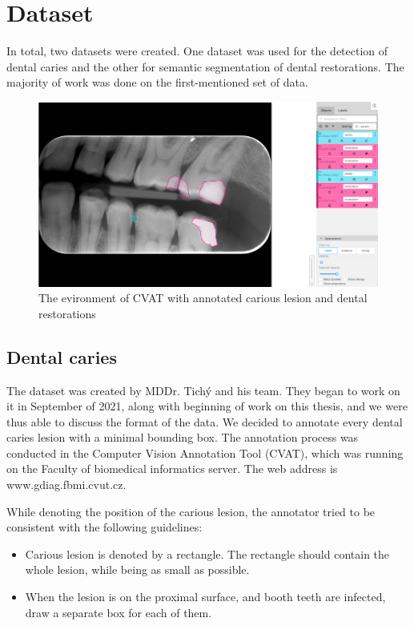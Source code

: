 \chapter{Dataset}
In total, two datasets were created. One dataset was used for the detection of dental caries and the other for semantic segmentation of dental restorations. The majority of work was done on the first-mentioned set of data.

\begin{figure}
    \centering
    \includegraphics[width=\linewidth]{images/cvat.png}
    \caption{The evironment of CVAT with annotated carious lesion and dental restorations}
    \label{fig:cvat}
\end{figure}

\section{Dental caries}
The dataset was created by MDDr. Tichý and his team. They began to work on it in September of 2021, along with beginning of work on this thesis, and we were thus able to discuss the format of the data. We decided to annotate every dental caries lesion with a minimal bounding box. The annotation process was conducted in the Computer Vision Annotation Tool (CVAT), which was running on the Faculty of biomedical informatics server. The web address is www.gdiag.fbmi.cvut.cz.

While denoting the position of the carious lesion, the annotator tried to be consistent with the following guidelines:

\begin{itemize}
    \item Carious lesion is denoted by a rectangle. The rectangle should contain the whole lesion, while being as small as possible.
    \item When the lesion is on the proximal surface, and booth teeth are infected, draw a separate box for each of them.
\end{itemize}

